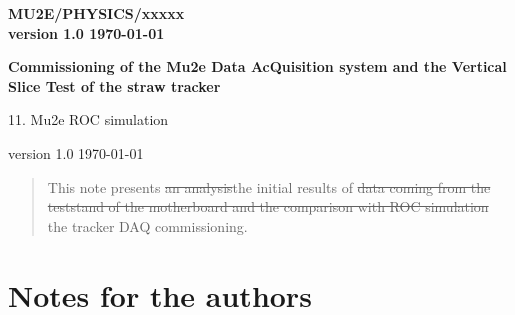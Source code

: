 \documentclass[12pt]{article}
\newcommand {\add}[1]    {{\red #1}}
\newcommand {\del}[1]    {{\blue \sout{#1}}}
\newcommand {\red}       {\color{red}}
\newcommand {\blue}      {\color{blue}}
\begin{document}
\begin{titlepage}
  \begin{flushright}
    \bf {MU2E/PHYSICS/xxxxx} \\
    version 1.0
    \today
 \end{flushright}

  \vspace{1cm}

  \begin{center}
    {\Large \bf Commissioning of the Mu2e Data AcQuisition system and the Vertical Slice Test of the straw tracker

      \vspace{0.3in}

      11. Mu2e ROC simulation
    }

    \vspace{1cm}

   
    version 1.0
    \today
 \end{center}

  \begin{abstract}
    This note presents \del{an analysis}\add{the initial results}
    of \del{data coming from the teststand of the motherboard and the comparison with ROC simulation}
    \add{the tracker DAQ commissioning}.
    \vspace{0.2in}
  \end{abstract}

\end{titlepage}
%
%
%
{\tableofcontents}

% 

\newpage
\section {Notes for the authors}
\end{document}
